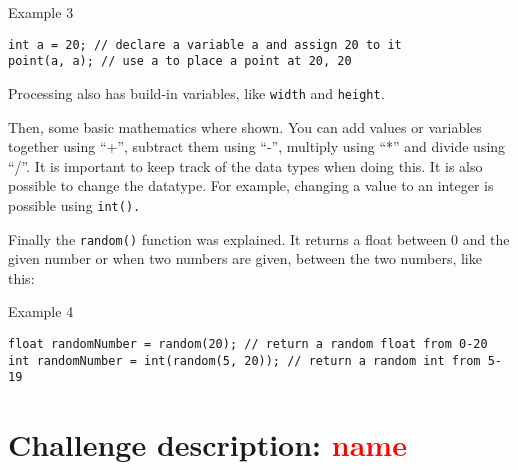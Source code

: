 \begin{codebox}{Example 3}
    \begin{lstlisting}
int a = 20; // declare a variable a and assign 20 to it
point(a, a); // use a to place a point at 20, 20
    \end{lstlisting}
\end{codebox}

Processing also has build-in variables, like \texttt{width} and \texttt{height}.

Then, some basic mathematics where shown. You can add values or variables together using ``+'', subtract them using ``-'', multiply using ``*'' and divide using ``/''. It is important to keep track of the data types when doing this. It is also possible to change the datatype. For example, changing a value to an integer is possible using \texttt{int().}

Finally the \texttt{random()} function was explained. It returns a float between 0 and the given number or when two numbers are given, between the two numbers, like this:

\begin{codebox}{Example 4}
    \begin{lstlisting}
float randomNumber = random(20); // return a random float from 0-20
int randomNumber = int(random(5, 20)); // return a random int from 5-19
    \end{lstlisting}
\end{codebox}

\section{Challenge description: \textcolor{red}{name}}
    
